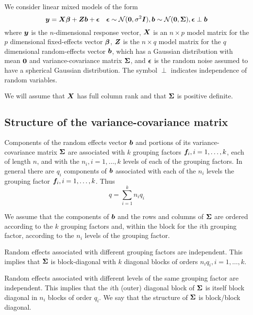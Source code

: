 \documentclass[12pt]{article}
\begin{document}
We consider linear mixed models of the form
\begin{equation}
  \label{eq:lmeGeneral}
  \bm{y}=\bm{X}\bm{\beta}+\bm{Z}\bm{b}+\bm{\epsilon}\quad
  \bm{\epsilon}\sim\mathcal{N}(\bm{0},\sigma^2\bm{I}),
  \bm{b}\sim\mathcal{N}(\bm{0},\bm{\Sigma}),
  \bm{\epsilon}\perp\bm{b}
\end{equation}
where $\bm{y}$ is the $n$-dimensional response vector, $\bm{X}$ is an
$n\times p$ model matrix for the $p$ dimensional fixed-effects vector
$\bm{\beta}$, $\bm{Z}$ is the $n\times q$ model matrix for the $q$
dimensional random-effects vector $\bm{b}$, which has a Gaussian
distribution with mean $\bm{0}$ and variance-covariance matrix
$\bm{\Sigma}$, and $\bm{\epsilon}$ is the random noise assumed to have a spherical
Gaussian distribution.  The symbol $\perp$ indicates independence of
random variables.

We will assume that $\bm{X}$ has full column rank and that $\bm{\Sigma}$ is
positive definite.

\subsection{Structure of the variance-covariance matrix}
\label{sec:sigmaStructure}

Components of the random effects vector $\bm{b}$ and portions of its
variance-covariance matrix $\bm{\Sigma}$ are associated with $k$ grouping
factors $\bm{f}_i, i=1,\dots,k$, each of length $n$, and with the $n_i,
i = 1,\dots,k$ levels of each of the grouping factors.  In general
there are $q_i$ components of $\bm{b}$ associated with each of the $n_i$
levels the grouping factor $\bm{f}_i, i = 1,\dots,k$.  Thus
\begin{equation}
  \label{eq:qdef}
  q = \sum_{i=1}^k n_i q_i 
\end{equation}

We assume that the components of $\bm{b}$ and the rows and columns of
$\bm{\Sigma}$ are ordered according to the $k$ grouping factors and,
within the block for the $i$th grouping factor, according to the $n_i$
levels of the grouping factor.

Random effects associated with different grouping factors are
independent.  This implies that $\bm{\Sigma}$ is block-diagonal with $k$
diagonal blocks of orders $n_i q_i, i=1,\dots,k$.

Random effects associated with different levels of the same grouping
factor are independent.  This implies that the $i$th (outer) diagonal
block of $\bm{\Sigma}$ is itself block diagonal in $n_i$ blocks of order $q_i$.
We say that the structure of $\bm{\Sigma}$ is block/block diagonal.
\end{document}
